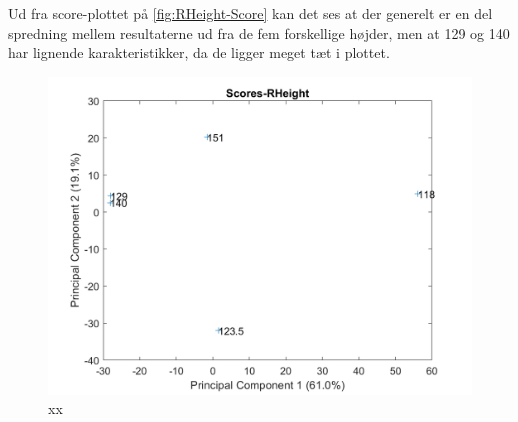 Ud fra score-plottet på \autoref{fig:RHeight-Score} kan det ses at der generelt er en del spredning mellem resultaterne ud fra de fem forskellige højder, men at 129 og 140 har lignende karakteristikker, da de ligger meget tæt i plottet.
\begin{figure}[H]
\centering
\includegraphics[width=\textwidth]{Figure/DatabehandlingSkalaer/PCAfigures/RHeight-Scores}
\caption{xx}
\label{fig:RHeight-Score}
\end{figure}

